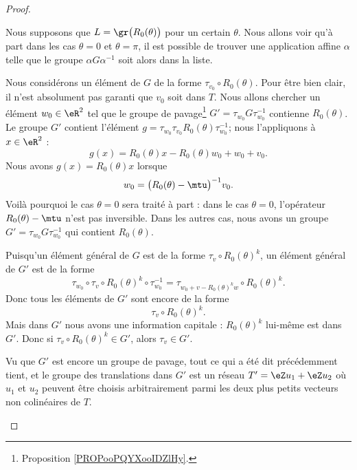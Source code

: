 \begin{proof}
\begin{subproof}

		Nous supposons que \( L=\gr\big( R_0(\theta) \big)\) pour un certain \( \theta\). Nous allons voir qu'à part dans les cas \( \theta=0\) et \( \theta=\pi\), il est possible de trouver une application affine \( \alpha\) telle que le groupe \( \alpha G\alpha^{-1}\) soit alors dans la liste.

		Nous considérons un élément de \( G\) de la forme \( \tau_{v_0}\circ R_0(\theta)\). Pour être bien clair, il n'est absolument pas garanti que \( v_0\) soit dans \( T\). Nous allons chercher un élément \( w_0\in \eR^2\) tel que le groupe de pavage\footnote{Proposition \ref{PROPooPQYXooIDZlHy}.} \( G'=\tau_{w_0}G\tau_{w_0}^{-1}\) contienne \( R_0(\theta)\). Le groupe \( G'\) contient l'élément \( g=\tau_{w_0}\tau_{v_0}R_0(\theta)\tau_{w_0}^{-1}\); nous l'appliquons à \( x\in \eR^2\) :
		\begin{equation}
			g(x)=R_0(\theta)x-R_0(\theta)w_0+w_0+v_0.
		\end{equation}
		Nous avons \( g(x)=R_0(\theta)x\) lorsque
		\begin{equation}
			w_0=\big( R_0(\theta)-\mtu \big)^{-1}v_0.
		\end{equation}
		Voilà pourquoi le cas \( \theta=0\) sera traité à part : dans le cas \( \theta=0\), l'opérateur \( R_0(\theta)-\mtu\) n'est pas inversible. Dans les autres cas, nous avons un groupe \( G'=\tau_{w_0}G\tau_{w_0}^{-1}\) qui contient \( R_0(\theta)\).

		Puisqu'un élément général de \( G\) est de la forme \( \tau_v\circ R_0(\theta)^k\), un élément général de \( G' \) est de la forme
		\begin{equation}
			\tau_{w_0}\circ \tau_v\circ R_0(\theta)^k\circ \tau_{w_0}^{-1}=\tau_{w_0+v-R_0(\theta)^kw}\circ R_0(\theta)^k.
		\end{equation}
		Donc tous les éléments de \( G'\) sont encore de la forme
		\begin{equation}
			\tau_v\circ R_0(\theta)^k.
		\end{equation}
		Mais dans \( G'\) nous avons une information capitale : \( R_0(\theta)^k\) lui-même est dans \( G'\). Donc si \( \tau_v\circ R_0(\theta)^k\in G'\), alors \( \tau_v\in G'\).

		Vu que \( G'\) est encore un groupe de pavage, tout ce qui a été dit précédemment tient, et le groupe des translations dans \( G'\) est un réseau \( T'=\eZ u_1+\eZ u_2\) où \( u_1\) et \( u_2\) peuvent être choisis arbitrairement parmi les deux plus petits vecteurs non colinéaires de \( T\).


\end{subproof}
\end{proof}
